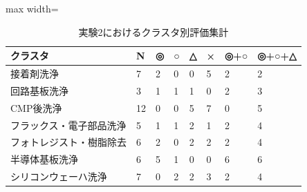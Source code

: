 \begin{table}[tbp]
\centering
\small
\caption{実験2におけるクラスタ別評価集計}
\label{tab:experiment2_cluster_summary_table}
\begin{adjustbox}{max width=\textwidth}
\begin{tabular}{llllllll}
\toprule
クラスタ & N & ◎ & ○ & △ & × & ◎+○ & ◎+○+△ \\
\midrule
接着剤洗浄 & 7 & 2 & 0 & 0 & 5 & 2 & 2 \\
回路基板洗浄 & 3 & 1 & 1 & 1 & 0 & 2 & 3 \\
CMP後洗浄 & 12 & 0 & 0 & 5 & 7 & 0 & 5 \\
フラックス・電子部品洗浄 & 5 & 1 & 1 & 2 & 1 & 2 & 4 \\
フォトレジスト・樹脂除去 & 6 & 2 & 0 & 2 & 2 & 2 & 4 \\
半導体基板洗浄 & 6 & 5 & 1 & 0 & 0 & 6 & 6 \\
シリコンウェーハ洗浄 & 7 & 0 & 2 & 2 & 3 & 2 & 4 \\
\bottomrule
\end{tabular}
\end{adjustbox}
\end{table}

